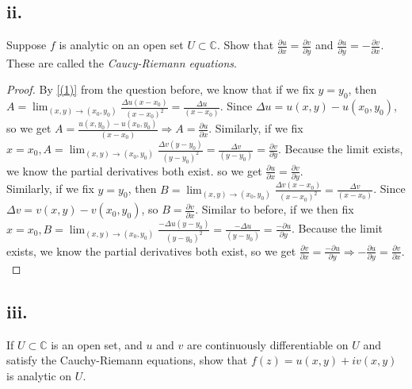 \documentclass{article}
\begin{document}
\subsection*{ii.}
Suppose $f$ is analytic on an open set $U \subset \mathbb{C.}$ Show that $\frac{\partial u}{\partial x} =\frac{\partial v}{\partial y}$ and $\frac{\partial u}{\partial y} =-\frac{\partial v}{\partial x}$. These are called the \textit{Caucy-Riemann equations}. 
\begin{proof}
    By \ref{(1)} from the question before, we know that if we fix $y=y_0$, then $ A= \lim_{(x,y)\rightarrow (x_0, y_0)} \frac{\Delta u(x-x_0)}{(x-x_0)^2}=\frac{\Delta u}{(x-x_0)}$. Since $\Delta u = u(x,y)-u(x_0,y_0)$, so we get $A = \frac{u(x,y_0)-u(x_0,y_0)}{(x-x_0)} \Rightarrow A=\frac{\partial u}{\partial x}$. Similarly, if we fix $x =x_0, A = \lim_{(x,y)\rightarrow (x_0, y_0)} \frac{\Delta v(y-y_0)}{(y-y_0)^2}=\frac{\Delta v}{(y-y_0)} = \frac{\partial v}{\partial y}$. Because the limit exists, we know the partial derivatives both exist. so we get $\frac{\partial u}{\partial x} =\frac{\partial v}{\partial y}$. \\
    Similarly, if we fix $y=y_0$, then $ B= \lim_{(x,y)\rightarrow (x_0, y_0)} \frac{\Delta v(x-x_0)}{(x-x_0)^2}=\frac{\Delta v}{(x-x_0)}$. Since $\Delta v = v(x,y)-v(x_0,y_0)$, so $B=\frac{\partial v}{\partial x}$. Similar to before, if we then fix $x =x_0, B = \lim_{(x,y)\rightarrow (x_0, y_0)} \frac{-\Delta u(y-y_0)}{(y-y_0)^2}=\frac{-\Delta u}{(y-y_0)} = \frac{-\partial u}{\partial y}$. Because the limit exists, we know the partial derivatives both exist, so we get $\frac{\partial v}{\partial x} =\frac{-\partial u}{\partial y} \Rightarrow -\frac{\partial u}{\partial y} = \frac{\partial v}{\partial x}$. \\
\end{proof}

\subsection*{iii.}
If $U \subset \mathbb{C}$ is an open set, and $u$ and $v$ are continuously differentiable on $U$ and satisfy the Cauchy-Riemann equations, show that $f(z) =u(x,y) + iv(x,y)$ is analytic on $U$.
\end{document}
